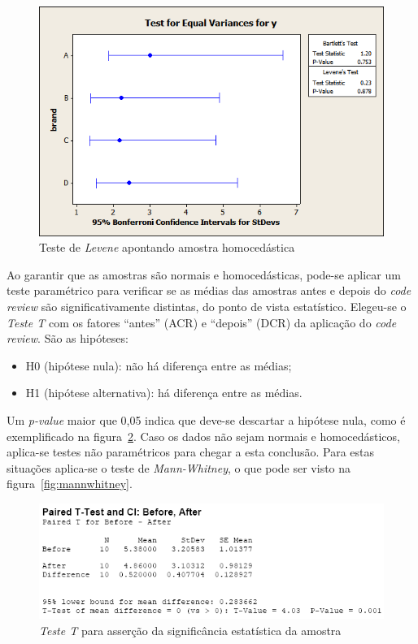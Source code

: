 \documentclass[12pt,openany,oneside,a4paper,english,brazil]{abntbibufjf}
\begin{document}
    \begin{figure}[H]
    \centering
      \includegraphics[width=\linewidth]{levene.png}
    \caption{Teste de \textit{Levene} apontando amostra homocedástica \cite{wang2009}}
    \label{fig:homocedasticidade}
    \end{figure}


    Ao garantir que as amostras são normais e homocedásticas, pode-se aplicar um teste paramétrico para verificar se as médias das amostras antes e depois do \textit{code review} são significativamente distintas, do ponto de vista estatístico. Elegeu-se o \textit{Teste T} com os fatores ``antes'' (ACR) e ``depois'' (DCR) da aplicação do \textit{code review}. São as hipóteses:

    \begin{itemize}
      \item H0 (hipótese nula): não há diferença entre as médias;
      \item H1 (hipótese alternativa): há diferença entre as médias.
    \end{itemize}

    Um \textit{p-value} maior que 0,05 indica que deve-se descartar a hipótese nula, como é exemplificado na figura~\ref{fig:test_t}. Caso os dados não sejam normais e homocedásticos, aplica-se testes não paramétricos para chegar a esta conclusão. Para estas situações aplica-se o teste de \textit{Mann-Whitney}, o que pode ser visto na figura~\ref{fig:mannwhitney}.

    \begin{figure}[H]
    \centering
      \includegraphics[width=\linewidth]{testt.png}
    \caption{\textit{Teste T} para asserção da significância estatística da amostra \cite{pensu2017b}}
    \label{fig:test_t}
    \end{figure}
\end{document}
